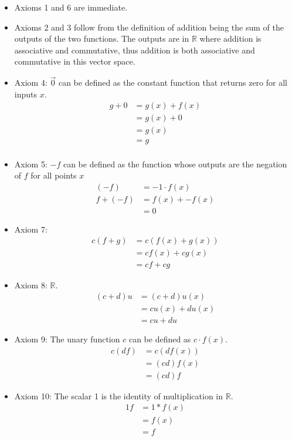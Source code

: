 \documentclass{article}
\theoremstyle{mytheoremstyle}
\theoremstyle{mytheoremstyle}
\theoremstyle{myproblemstyle}
\begin{document}
    \begin{itemize}
        \item Axioms 1 and 6 are immediate.
        \item Axioms 2 and 3 follow from the definition of addition being the
            sum of the outputs of the two functions. The outputs are in
            $\mathbb{R}$ where addition is associative and commutative, thus
            addition is both associative and commutative in this vector space.
        \item Axiom 4: $\vec{0}$ can be defined as the constant function that returns
            zero for all inputs $x$.
            \begin{align*}
                g+0       &= g(x)+f(x) \\
                          &= g(x) + 0 \\
                          &= g(x) \\
                          &= g \\
            \end{align*}
        \item Axiom 5: $-f$ can be defined as the function whose outputs are the
            negation of $f$ for all points $x$
            \begin{align*}
                (-f)   &= -1\cdot f(x) \\
                f+(-f) &= f(x) + -f(x) \\
                       &= 0
            \end{align*}
        \item Axiom 7:
            \begin{align*}
                c(f+g)&=c(f(x)+g(x)) \\
                      &= cf(x) + cg(x) \\
                      &= cf + cg
            \end{align*}
        \item Axiom 8:
            $\mathbb{R}$.
            \begin{align*}
                (c+d)u &= (c+d)u(x) \\
                       &= cu(x)+du(x) \\
                       &= cu+du
            \end{align*}
        \item Axiom 9: The unary function $c$ can be defined as $c\cdot f(x)$.
            \begin{align*}
                c(df) &= c(df(x)) \\
                      &= (cd)f(x) \\
                      &= (cd)f
            \end{align*}
        \item Axiom 10: The scalar 1 is the identity of multiplication in
            $\mathbb{R}$.
            \begin{align*}
                1f &= 1*f(x) \\
                   &= f(x) \\
                   &= f
            \end{align*}
    \end{itemize}
\end{document}
